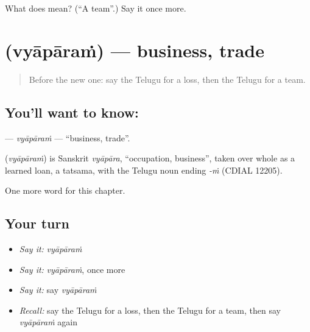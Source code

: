 \begin{tcolorbox}[breakable,colback=teal!4,colframe=teal!35!black,title={Before you move on}]
What does  mean? (\textquotedblleft{}A team\textquotedblright{}.) Say it once more.
\end{tcolorbox}
\section[\texorpdfstring{\te{వ్యాపారం} (vyāpāraṁ)}{వ్యాపారం (vyāpāraṁ)}]{ (vyāpāraṁ) — business, trade}

\label{lesson:TE-C236-vyaparam}



\begin{quote}
Before the new one: say the Telugu for a loss, then the Telugu for a team.
\end{quote}

\subsection*{You'll want to know: }
\textbf{} — \emph{vyāpāraṁ} — \textquotedblleft{}business, trade\textquotedblright{}.

\begin{cousinweb}
\textbf{} (\emph{vyāpāraṁ}) is Sanskrit \emph{vyāpāra}, \textquotedblleft{}occupation, business\textquotedblright{}, taken over whole as a learned loan, a tatsama, with the Telugu noun ending \emph{-ṁ} (CDIAL 12205).
\end{cousinweb}

\begin{grammarlens}[title={What you've built}]
One more word for this chapter.
\end{grammarlens}

\subsection*{Your turn}
\begin{itemize}
\raggedright
  \item \emph{Say it:} \emph{vyāpāraṁ}
  \item \emph{Say it:} \emph{vyāpāraṁ}, once more
  \item \emph{Say it:} say \emph{vyāpāraṁ}
  \item \emph{Recall:} say the Telugu for a loss, then the Telugu for a team, then say \emph{vyāpāraṁ} again
\end{itemize}

